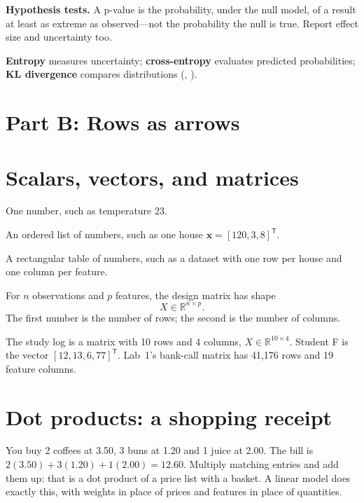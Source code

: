 \begin{optionaltopic}
\textbf{Hypothesis tests.} A p-value is the probability, under the null model, of a result at least as extreme as observed---not the probability the null is true. Report effect size and uncertainty too.
\end{optionaltopic}

\begin{optionaltopic}
\textbf{Entropy} measures uncertainty; \textbf{cross-entropy} evaluates predicted probabilities; \textbf{KL divergence} compares distributions (, ).
\end{optionaltopic}

\section*{Part B: Rows as arrows}
\section{Scalars, vectors, and matrices}

\begin{description}[leftmargin=1.1in,style=nextline]
  \item[Scalar] One number, such as temperature $23$.
  \item[Vector] An ordered list of numbers, such as one house $\bm{x}=[120,3,8]^{\mathsf T}$.
  \item[Matrix] A rectangular table of numbers, such as a dataset with one row per house and one column per feature.
\end{description}

For $n$ observations and $p$ features, the design matrix has shape
\[
  X\in\mathbb{R}^{n\times p}.
\]
The first number is the number of rows; the second is the number of columns.

\begin{workedexample}
The study log is a matrix with 10 rows and 4 columns, $X\in\mathbb{R}^{10\times4}$. Student F is the vector $[12,13,6,77]^{\mathsf T}$. Lab~1's bank-call matrix has 41,176 rows and 19 feature columns.
\end{workedexample}

\section{Dot products: a shopping receipt}

\begin{analogy}
You buy 2 coffees at 3.50, 3 buns at 1.20 and 1 juice at 2.00. The bill is $2(3.50)+3(1.20)+1(2.00)=12.60$. Multiply matching entries and add them up: that is a dot product of a price list with a basket. A linear model does exactly this, with weights in place of prices and features in place of quantities.
\end{analogy}

